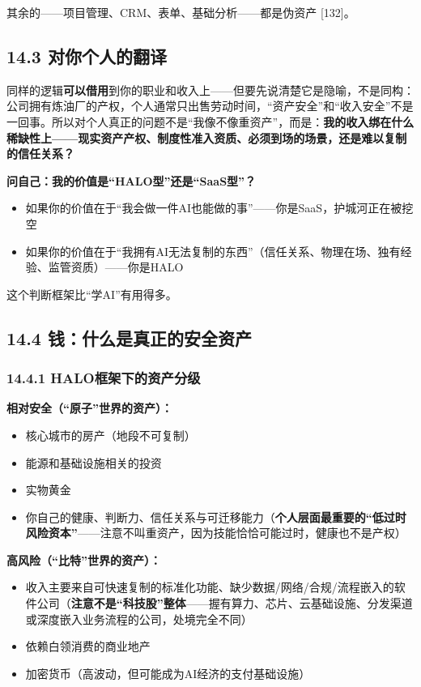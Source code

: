 \documentclass[11pt,a4paper]{ctexart}
\begin{document}
其余的——项目管理、CRM、表单、基础分析——都是伪资产 [132]。

\subsection{14.3 对你个人的翻译}

同样的逻辑\textbf{可以借用}到你的职业和收入上——但要先说清楚它是隐喻，不是同构：公司拥有炼油厂的产权，个人通常只出售劳动时间，“资产安全”和“收入安全”不是一回事。所以对个人真正的问题不是“我像不像重资产”，而是：\textbf{我的收入绑在什么稀缺性上——现实资产产权、制度性准入资质、必须到场的场景，还是难以复制的信任关系？}

\textbf{问自己：我的价值是“HALO型”还是“SaaS型”？}

\begin{itemize}
  \item 如果你的价值在于“我会做一件AI也能做的事”——你是SaaS，护城河正在被挖空
  \item 如果你的价值在于“我拥有AI无法复制的东西”（信任关系、物理在场、独有经验、监管资质）——你是HALO
\end{itemize}

这个判断框架比“学AI”有用得多。

\subsection{14.4 钱：什么是真正的安全资产}

\subsubsection{14.4.1 HALO框架下的资产分级}

\textbf{相对安全（“原子”世界的资产）：}

\begin{itemize}
  \item 核心城市的房产（地段不可复制）
  \item 能源和基础设施相关的投资
  \item 实物黄金
  \item 你自己的健康、判断力、信任关系与可迁移能力（\textbf{个人层面最重要的“低过时风险资本”}——注意不叫重资产，因为技能恰恰可能过时，健康也不是产权）
\end{itemize}

\textbf{高风险（“比特”世界的资产）：}

\begin{itemize}
  \item 收入主要来自可快速复制的标准化功能、缺少数据/网络/合规/流程嵌入的软件公司（\textbf{注意不是“科技股”整体}——握有算力、芯片、云基础设施、分发渠道或深度嵌入业务流程的公司，处境完全不同）
  \item 依赖白领消费的商业地产
  \item 加密货币（高波动，但可能成为AI经济的支付基础设施）
\end{itemize}
\end{document}
